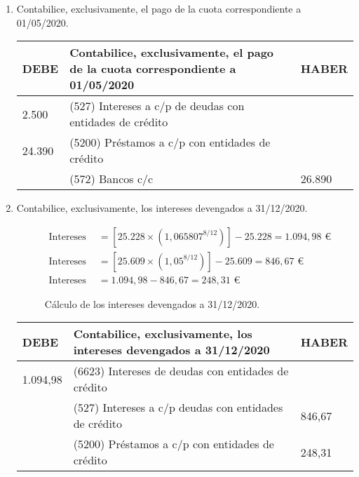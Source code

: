 \begin{enumerate}[label=\alph*)]
\item Contabilice, exclusivamente, el pago de la cuota correspondiente a 01/05/2020.

\begin{table}[H]
\centering
\begin{tabular}{|p{2cm}|p{8cm}|p{2cm}|}
\hline
\rowcolor{blue!30}
\textbf{DEBE} & \textbf{Contabilice, exclusivamente, el pago de la cuota correspondiente a 01/05/2020} & \textbf{HABER} \\ \hline
2.500 & (527) Intereses a c/p de deudas con entidades de crédito & \\ \hline
24.390 & (5200) Préstamos a c/p con entidades de crédito & \\ \hline
& (572) Bancos c/c & 26.890 \\ \hline
\end{tabular}
\end{table}

\item Contabilice, exclusivamente, los intereses devengados a 31/12/2020.

\begin{figure}[H]
    \begin{align*}
        \text{Intereses totales} &= \left[25.228 \times \left(1,065807^{8/12}\right)\right] - 25.228 = 1.094,98 \text{ €} \\
        \text{Intereses explícitos} &= \left[25.609 \times \left(1,05^{8/12}\right)\right] - 25.609 = 846,67 \text{ €} \\
        \text{Intereses implícitos} &= 1.094,98 - 846,67 = 248,31 \text{ €}
    \end{align*}
    \caption{Cálculo de los intereses devengados a 31/12/2020.}
    \label{fig:intereses_devengados_ejercicio4_2020}
\end{figure}

\begin{table}[H]
\centering
\begin{tabular}{|p{2cm}|p{8cm}|p{2cm}|}
\hline
\rowcolor{blue!30}
\textbf{DEBE} & \textbf{Contabilice, exclusivamente, los intereses devengados a 31/12/2020} & \textbf{HABER} \\ \hline
1.094,98 & (6623) Intereses de deudas con entidades de crédito & \\ \hline
& (527) Intereses a c/p deudas con entidades de crédito & 846,67 \\ \hline
& (5200) Préstamos a c/p con entidades de crédito & 248,31 \\ \hline
\end{tabular}
\end{table}


\end{enumerate}
